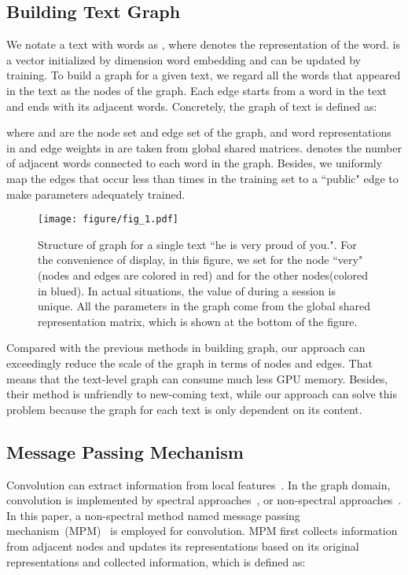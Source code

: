 \documentclass[11pt,a4paper]{article}
\begin{document}
\subsection{Building Text Graph}\label{graph_def}


We notate a text with  words as , where  denotes the representation of  the  word.
 is a vector initialized by  dimension word embedding and can be updated by training. To build a graph for a given text, we regard all the words that appeared in the text as the nodes of the graph. Each edge starts from a word in the text and ends with its adjacent words. Concretely, the graph of text  is defined as:

where  and  are the node set and edge set of the graph, and word representations in  and edge weights in  are taken from global shared matrices.  denotes the number of adjacent words connected to each word in the graph. Besides, we uniformly map the edges that occur less than  times in the training set to a ``public" edge to make parameters adequately trained. 


\begin{figure}[t]
    \centering
    \texttt{[image: figure/fig\_1.pdf]}
    \caption{Structure of graph for a single text ``he is very proud of you.". For the convenience of display, in this figure, we set  for the node ``very" (nodes and edges are colored in red) and   for the other nodes(colored in blued). In actual situations, the value of  during a session is unique. All the parameters in the graph come from the global shared representation matrix, which is shown at the bottom of the figure.}
    \label{fig:main_flg}
\end{figure}
Compared with the previous methods in building graph, our approach can exceedingly reduce the scale of the graph in terms of nodes and edges. That means that the text-level graph can consume much less GPU memory. Besides, their method is unfriendly to new-coming text, while our approach can solve this problem because the graph for each text is only dependent on its content.


\subsection{Message Passing Mechanism}\label{sec:mpm}


Convolution can extract information from local features~\cite{lecun1989backpropagation}. In the graph domain, convolution is implemented by spectral approaches~\cite{bruna2013spectral, henaff2015deep}, or non-spectral approaches~\cite{duvenaud2015convolutional}. In this paper, a non-spectral method named message passing mechanism~(MPM)~\cite{gilmer2017neural} is employed for convolution. MPM first collects information from adjacent nodes and updates its representations based on its original representations and collected information, which is defined as:
\end{document}
